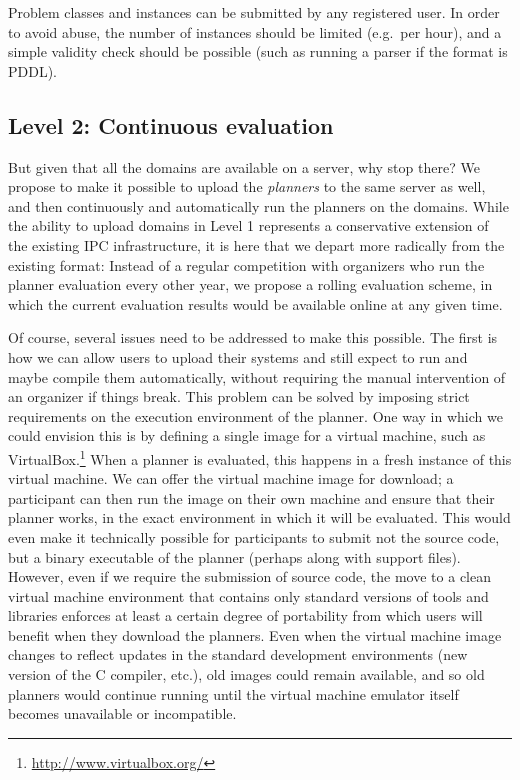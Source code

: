 Problem classes and instances can be submitted by any registered
user. In order to avoid abuse, the number of instances should be
limited (e.g.\ per hour), and a simple validity check should be
possible (such as running a parser if the format is PDDL).



\subsection{Level 2: Continuous evaluation}

But given that all the domains are available on a server, why stop
there?  We propose to make it possible to upload the \emph{planners}
to the same server as well, and then continuously and automatically
run the planners on the domains.  While the ability to upload domains
in Level 1 represents a conservative extension of the existing IPC
infrastructure, it is here that we depart more radically from the
existing format: Instead of a regular competition with organizers who
run the planner evaluation every other year, we propose a rolling
evaluation scheme, in which the current evaluation results would be
available online at any given time.

Of course, several issues need to be addressed to make this possible.
The first is how we can allow users to upload their systems and still
expect to run and maybe compile them automatically, without requiring
the manual intervention of an organizer if things break.  This problem
can be solved by imposing strict requirements on the execution
environment of the planner.  One way in which we could envision this
is by defining a single image for a virtual machine, such as
VirtualBox.\footnote{\url{http://www.virtualbox.org/}} When a planner
is evaluated, this happens in a fresh instance of this virtual
machine.  We can offer the virtual machine image for download; a
participant can then run the image on their own machine and ensure
that their planner works, in the exact environment in which it will be
evaluated.  This would even make it technically possible for
participants to submit not the source code, but a binary executable of
the planner (perhaps along with support files).  However, even if we
require the submission of source code, the move to a clean virtual
machine environment that contains only standard versions of tools and
libraries enforces at least a certain degree of portability from which
users will benefit when they download the planners.  Even when the
virtual machine image changes to reflect updates in the standard
development environments (new version of the C compiler, etc.), old
images could remain available, and so old planners would continue
running until the virtual machine emulator itself becomes unavailable
or incompatible.

